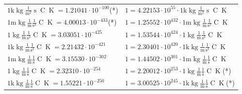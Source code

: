 \begin{center}
\begin{longtable}{l l}
{\color{gray}$1 \bm{\mathrm{ k}}\operatorname{kg}\frac1{\operatorname{m}^2}{\operatorname{s}}{\operatorname{C}}{\operatorname{K}} = 1.21041\cdot10^{-100} $}\quad(*) & {\color{gray}$ 1 = 4.22153\cdot10^{55} \cdot 1 \bm{\mathrm{ k}}\operatorname{kg}\frac1{\operatorname{m}^2}{\operatorname{s}}{\operatorname{C}}{\operatorname{K}}$}  \\
{\color{gray}$1 \bm{\mathrm{ m}}\operatorname{kg}\frac1{\operatorname{m}}\frac1{\operatorname{s}^2}{\operatorname{C}}{\operatorname{K}} = 4.00013\cdot10^{-433} $}\quad(*) & {\color{gray}$ 1 = 1.25552\cdot10^{432} \cdot 1 \bm{\mathrm{ m}}\operatorname{kg}\frac1{\operatorname{m}}\frac1{\operatorname{s}^2}{\operatorname{C}}{\operatorname{K}}$}  \\
{\color{black}$1 \bm{\mathrm{ }}\operatorname{kg}\frac1{\operatorname{m}}\frac1{\operatorname{s}^2}{\operatorname{C}}{\operatorname{K}} = 3.03051\cdot10^{-425} $}   & {\color{black}$ 1 = 1.53544\cdot10^{424} \cdot 1 \bm{\mathrm{ }}\operatorname{kg}\frac1{\operatorname{m}}\frac1{\operatorname{s}^2}{\operatorname{C}}{\operatorname{K}}$}  \\
{\color{gray}$1 \bm{\mathrm{ k}}\operatorname{kg}\frac1{\operatorname{m}}\frac1{\operatorname{s}^2}{\operatorname{C}}{\operatorname{K}} = 2.21432\cdot10^{-421} $}   & {\color{gray}$ 1 = 2.30401\cdot10^{420} \cdot 1 \bm{\mathrm{ k}}\operatorname{kg}\frac1{\operatorname{m}}\frac1{\operatorname{s}^2}{\operatorname{C}}{\operatorname{K}}$}  \\
{\color{gray}$1 \bm{\mathrm{ m}}\operatorname{kg}\frac1{\operatorname{m}}\frac1{\operatorname{s}}{\operatorname{C}}{\operatorname{K}} = 3.15530\cdot10^{-302} $}   & {\color{gray}$ 1 = 1.44502\cdot10^{301} \cdot 1 \bm{\mathrm{ m}}\operatorname{kg}\frac1{\operatorname{m}}\frac1{\operatorname{s}}{\operatorname{C}}{\operatorname{K}}$}  \\
{\color{black}$1 \bm{\mathrm{ }}\operatorname{kg}\frac1{\operatorname{m}}\frac1{\operatorname{s}}{\operatorname{C}}{\operatorname{K}} = 2.32310\cdot10^{-254} $}   & {\color{black}$ 1 = 2.20012\cdot10^{253} \cdot 1 \bm{\mathrm{ }}\operatorname{kg}\frac1{\operatorname{m}}\frac1{\operatorname{s}}{\operatorname{C}}{\operatorname{K}}$}\quad(*)\\
{\color{gray}$1 \bm{\mathrm{ k}}\operatorname{kg}\frac1{\operatorname{m}}\frac1{\operatorname{s}}{\operatorname{C}}{\operatorname{K}} = 1.55221\cdot10^{-250} $}   & {\color{gray}$ 1 = 3.00525\cdot10^{245} \cdot 1 \bm{\mathrm{ k}}\operatorname{kg}\frac1{\operatorname{m}}\frac1{\operatorname{s}}{\operatorname{C}}{\operatorname{K}}$}\quad(*)\\

\end{longtable}
\end{center}
